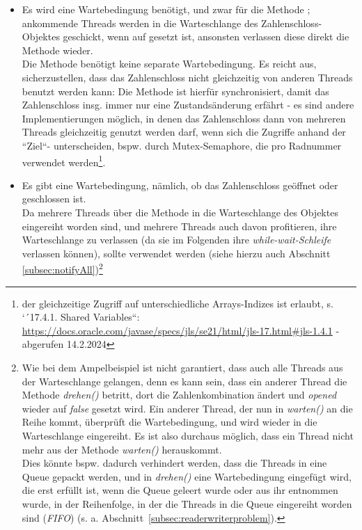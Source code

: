 \begin{itemize}
    \item Es wird eine Wartebedingung benötigt, und zwar für die Methode ; ankommende Threads werden
    in die Warteschlange des Zahlenschloss-Objektes geschickt, wenn  auf  gesetzt ist, ansonsten
    verlassen diese direkt die Methode wieder.\\
    Die Methode  benötigt keine separate Wartebedingung.
    Es reicht aus, sicherzustellen, dass das Zahlenschloss nicht gleichzeitig von anderen Threads benutzt werden kann:
    Die Methode  ist hierfür synchronisiert, damit das Zahlenschloss {insg.} immer nur eine Zustandsänderung
    erfährt - es sind andere Implementierungen möglich, in denen das Zahlenschloss dann von mehreren Threads gleichzeitig
    genutzt werden darf, wenn sich die Zugriffe anhand der ``Ziel``- unterscheiden, {bspw.} durch Mutex-Semaphore,
    die pro Radnummer verwendet werden\footnote{
        der gleichzeitige Zugriff auf unterschiedliche Arrays-Indizes ist erlaubt, s. `´17.4.1. Shared Variables``: \url{https://docs.oracle.com/javase/specs/jls/se21/html/jls-17.html#jls-1.4.1} - abgerufen 14.2.2024
    }.
    \item Es gibt eine Wartebedingung, nämlich, ob das Zahlenschloss geöffnet oder geschlossen ist.\\
    Da mehrere Threads über die Methode  in die Warteschlange des Objektes eingereiht worden sind, und mehrere Threads auch davon profitieren, ihre Warteschlange zu verlassen (da sie im Folgenden ihre \textit{while-wait-Schleife} verlassen können), sollte  verwendet werden (siehe hierzu auch Abschnitt \ref{subsec:notifyAll})\footnote{
    Wie bei dem Ampelbeispiel ist nicht garantiert, dass auch alle Threads aus der Warteschlange gelangen, denn es kann sein, dass ein anderer Thread die Methode \textit{drehen()} betritt, dort die Zahlenkombination ändert und \textit{opened} wieder auf \textit{false} gesetzt wird.
    Ein anderer Thread, der nun in  \textit{warten()} an die Reihe kommt, überprüft die Wartebedingung, und wird wieder in die Warteschlange eingereiht.
    Es ist also durchaus möglich, dass ein Thread nicht mehr aus der Methode \textit{warten()} herauskommt.\\
    Dies könnte bspw. dadurch verhindert werden, dass die Threads in eine Queue gepackt werden, und in \textit{drehen()} eine Wartebedingung eingefügt wird, die erst erfüllt ist,
    wenn die Queue geleert wurde oder aus ihr entnommen wurde, in der Reihenfolge, in der die Threads in die Queue eingereiht worden sind (\textit{FIFO}) (s. a. Abschnitt~\ref{subsec:readerwriterproblem}).
}
\end{itemize}
